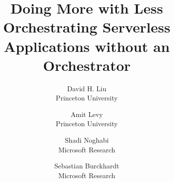 \documentclass[letterpaper,twocolumn,10pt]{article}
\newcommand{\name}{Unum}
\begin{document}

\date{}

\title{Doing More with Less \\ Orchestrating Serverless Applications
without an Orchestrator}

\author{
{\rm David H. Liu}\\
Princeton University
\and
{\rm Amit Levy}\\
Princeton University
\and
{\rm Shadi Noghabi}\\
Microsoft Research
\and
{\rm Sebastian Burckhardt}\\
Microsoft Research
} %

\maketitle
\thispagestyle{empty}

\abstract{}













\end{document}
